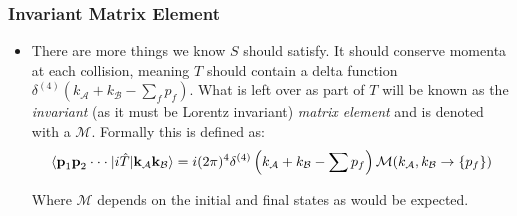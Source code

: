 \documentclass[11pt]{article}
\numberwithin{equation}{section}
\begin{document}
\subsubsection{Invariant Matrix Element} %
\label{ssub:invariant_matrix_element}
\begin{itemize}
  \item There are more things we know $S$ should satisfy. It should conserve momenta at each collision, meaning $T$ should contain a delta function $\delta^{(4)}(k_{\mathcal{A}}+k_{\mathcal{B}} - \sum_{f}p_f)$. What is left over as part of $T$ will be known as the \emph{invariant} (as it must be Lorentz invariant) \emph{matrix element} and is denoted with a $\mathcal{M}$. Formally this is defined as:
 \begin{align}
 \label{M_matrix}
   \braket{\textbf{p}_1\textbf{p}_2 \cdot \cdot \cdot|i\hat{T}|\textbf{k}_{\mathcal{A}}\textbf{k}_{\mathcal{B}}} = i(2\pi)^4\delta^{(4)}\left(k_{\mathcal{A}}+k_{\mathcal{B}} - \sum p_f\right)\mathcal{M}(k_{\mathcal{A}},k_{\mathcal{B}} \rightarrow \{p_f\})
 \end{align}

 Where $\mathcal{M}$ depends on the initial and final states as would be expected. 
\end{itemize}
\end{document}
